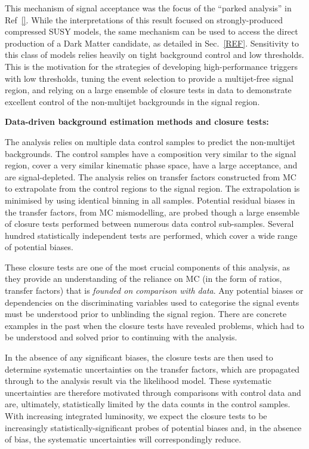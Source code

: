 This mechanism of signal acceptance was the focus of the ``parked
analysis'' in Ref~\ref{}. While the interpretations of this result
focused on strongly-produced compressed SUSY models, the same
mechanism can be used to access the direct production of a Dark Matter
candidate, as detailed in Sec.~\ref{REF}. Sensitivity to this class of
models relies heavily on tight background control and low
thresholds. This is the motivation for the strategies of developing
high-performance triggers with low thresholds, tuning the event
selection to provide a multijet-free signal region, and relying on a
large ensemble of closure tests in data to demonstrate excellent
control of the non-multijet backgrounds in the signal region.

{\bf Data-driven background estimation methods and closure tests:}

The analysis relies on multiple data control samples to predict the
non-multijet backgrounds. The control samples have a composition very
similar to the signal region, cover a very similar kinematic phase
space, have a large acceptance, and are signal-depleted. The analysis
relies on transfer factors constructed from MC to extrapolate from the
control regions to the signal region. The extrapolation is minimised
by using identical binning in all samples. Potential residual biases
in the transfer factors, \eg from MC mismodelling, are probed though a
large ensemble of closure tests performed between numerous data
control sub-samples. Several hundred statistically independent tests
are performed, which cover a wide range of potential biases. 

These closure tests are one of the most crucial components of this
analysis, as they provide an understanding of the reliance on MC (in
the form of ratios, \ie transfer factors) that is {\it founded on
  comparison with data}. Any potential biases or dependencies on the
discriminating variables used to categorise the signal events must be
understood prior to unblinding the signal region. There are concrete
examples in the past when the closure tests have revealed problems,
which had to be understood and solved prior to continuing with the
analysis.

In the absence of any significant biases, the closure tests are then
used to determine systematic uncertainties on the transfer factors,
which are propagated through to the analysis result via the likelihood
model. These systematic uncertainties are therefore motivated through
comparisons with control data and are, ultimately, statistically
limited by the data counts in the control samples. With increasing
integrated luminosity, we expect the closure tests to be increasingly
statistically-significant probes of potential biases and, in the
absence of bias, the systematic uncertainties will correspondingly
reduce.

